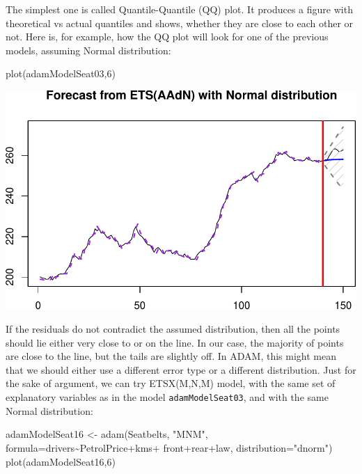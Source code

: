 \documentclass[
]{book}
\newenvironment{Shaded}{\begin{snugshade}}{\end{snugshade}}
\newcommand{\AttributeTok}[1]{\textcolor[rgb]{0.77,0.63,0.00}{#1}}
\newcommand{\DecValTok}[1]{\textcolor[rgb]{0.00,0.00,0.81}{#1}}
\newcommand{\FunctionTok}[1]{\textcolor[rgb]{0.00,0.00,0.00}{#1}}
\newcommand{\NormalTok}[1]{#1}
\newcommand{\OtherTok}[1]{\textcolor[rgb]{0.56,0.35,0.01}{#1}}
\newcommand{\SpecialCharTok}[1]{\textcolor[rgb]{0.00,0.00,0.00}{#1}}
\newcommand{\StringTok}[1]{\textcolor[rgb]{0.31,0.60,0.02}{#1}}
\theoremstyle{definition}
\theoremstyle{definition}
\theoremstyle{definition}
\theoremstyle{definition}
\theoremstyle{remark}
\begin{document}
The simplest one is called Quantile-Quantile (QQ) plot. It produces a figure with theoretical vs actual quantiles and shows, whether they are close to each other or not. Here is, for example, how the QQ plot will look for one of the previous models, assuming Normal distribution:

\begin{Shaded}
\begin{Highlighting}[]
\FunctionTok{plot}\NormalTok{(adamModelSeat03,}\DecValTok{6}\NormalTok{)}
\end{Highlighting}
\end{Shaded}

\includegraphics{adam_files/figure-latex/unnamed-chunk-161-1.pdf}

If the residuals do not contradict the assumed distribution, then all the points should lie either very close to or on the line. In our case, the majority of points are close to the line, but the tails are slightly off. In ADAM, this might mean that we should either use a different error type or a different distribution. Just for the sake of argument, we can try ETSX(M,N,M) model, with the same set of explanatory variables as in the model \texttt{adamModelSeat03}, and with the same Normal distribution:

\begin{Shaded}
\begin{Highlighting}[]
\NormalTok{adamModelSeat16 }\OtherTok{\textless{}{-}} \FunctionTok{adam}\NormalTok{(Seatbelts, }\StringTok{"MNM"}\NormalTok{,}
                        \AttributeTok{formula=}\NormalTok{drivers}\SpecialCharTok{\textasciitilde{}}\NormalTok{PetrolPrice}\SpecialCharTok{+}\NormalTok{kms}\SpecialCharTok{+}
\NormalTok{                          front}\SpecialCharTok{+}\NormalTok{rear}\SpecialCharTok{+}\NormalTok{law,}
                        \AttributeTok{distribution=}\StringTok{"dnorm"}\NormalTok{)}
\FunctionTok{plot}\NormalTok{(adamModelSeat16,}\DecValTok{6}\NormalTok{)}
\end{Highlighting}
\end{Shaded}
\end{document}
